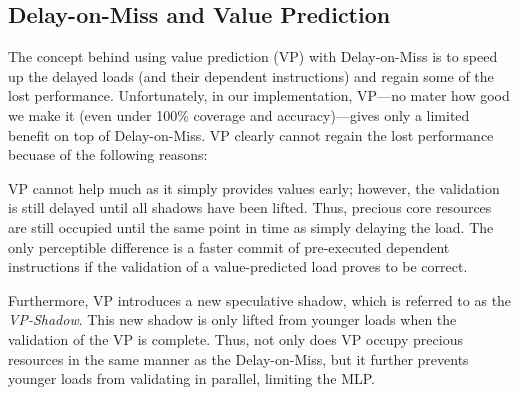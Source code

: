 \fi

\subsection{Delay-on-Miss and Value Prediction} 

The concept behind using value prediction (VP) with Delay-on-Miss is to speed up the delayed loads (and their dependent instructions) and regain some of the lost performance. Unfortunately, in our implementation, VP---no mater how good we make it (even under 100\% coverage and accuracy)---gives only a limited benefit on top of Delay-on-Miss. VP clearly cannot regain the lost performance becuase of the following reasons:


VP cannot help much as it simply provides values early; however, the validation is still delayed until all shadows have been lifted. Thus, precious core resources are still occupied until the same point in time as simply delaying the load.
The only perceptible difference is a faster commit of pre-executed dependent instructions if the validation of a value-predicted load proves to be correct.

Furthermore, VP introduces a new speculative shadow, which is referred to as the \emph{VP-Shadow}. This new shadow is only lifted from younger loads when the validation of the VP is complete. Thus, not only does VP occupy precious resources in the same manner as the Delay-on-Miss, but it further prevents younger loads from validating in parallel, limiting the MLP. 

